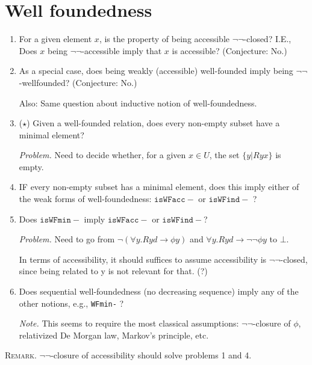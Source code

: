 \documentclass{scrartcl}
\begin{document}
\section{Well foundedness }
\begin{enumerate}
    \item For a given element $x$, is the property of
    being accessible $\lnot\lnot$-closed? I.E.,
    Does $x$ being $\lnot\lnot$-accessible imply that $x$ is accessible?
    (Conjecture: No.)
  
    \item As a special case, does being weakly (accessible) well-founded imply being $\lnot\lnot$-wellfounded?
    (Conjecture: No.)
  
    Also: Same question about inductive notion of well-foundedness.
  
    \item ($\star$) Given a well-founded relation, does every non-empty subset
    have a minimal element?
  
    \emph{Problem.} Need to decide whether, for a given $x \in U$,
     the set $\{y | Ryx\}$ is empty.
  
     \item IF every non-empty subset has a minimal element, does this imply
     either of the weak forms of well-foundedness: $\mathtt{isWFacc-}$ or
     $\mathtt{isWFind-}$ ?
  
     \item Does $\mathtt{isWFmin-}$ imply $\mathtt{isWFacc-}$ or $\mathtt{isWFind-}$?
  
     \emph{Problem.} Need to go from $\lnot (\forall y. R y d \to \phi y)$
     and $\forall y. R y d \to \lnot \lnot \phi y$ to $\bot$.
  
     In terms of accessibility, it should suffices to assume accessibility is
     $\lnot\lnot$-closed, since being related to y is not relevant for that. (?)
  
     \item Does sequential well-foundedness (no decreasing sequence) imply
     any of the other notions, e.g., \texttt{WFmin-} ?
  
     \emph{Note.}  This seems to require the most classical assumptions:
     $\lnot\lnot$-closure of $\phi$, relativized De Morgan law,
     Markov's principle, etc.
  
     
  
  \end{enumerate}
  
  \textsc{Remark.}
  $\lnot\lnot$-closure of accessibility should solve problems 1 and 4.
  
\end{document}
